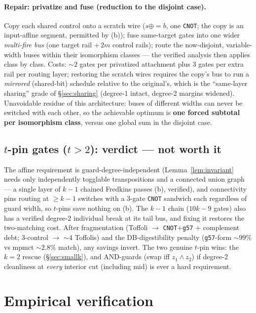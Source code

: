 \documentclass[11pt]{article}
\theoremstyle{remark}
\newcommand{\g}{\texttt{g57}}
\newcommand{\CNOT}{\texttt{CNOT}}
\begin{document}
\paragraph{Repair: privatize and fuse (reduction to the disjoint case).} Copy each shared
control onto a scratch wire ($s\mathrel{\oplus{=}}b$, one \CNOT; the copy is an input-affine
segment, permitted by (b)); fuse same-target gates into one wider \emph{multi-fire bus} (one
target rail $+\,2m$ control rails); route the now-disjoint, variable-width buses within their
isomorphism classes --- the verified analysis then applies class by class. Costs: ${\sim}2$
gates per privatized attachment plus $3$ gates per extra rail per routing layer; restoring the
scratch wires requires the copy's bus to run a \emph{mirrored} (shared-bit) schedule relative to
the original's, which is the ``same-layer sharing'' grade of \S\ref{sec:sharing} (degree-1
intact, degree-2 margins widened). Unavoidable residue of this architecture: buses of different
widths can never be switched with each other, so the achievable optimum is \textbf{one forced
subtotal per isomorphism class}, versus one global sum in the disjoint case.

\subsection{$t$-pin gates ($t>2$): verdict --- not worth it}\label{sec:tpin}

The affine requirement is guard-degree-independent (Lemma~\ref{lem:invariant} needs only
independently togglable transpositions and a connected union graph --- a single layer of $k{-}1$
chained Fredkins passes (b), verified), and connectivity pins routing at $\ge k-1$ switches with
a 3-gate \CNOT{} sandwich each regardless of guard width, so $t$-pins save nothing on (b). The
$k{-}1$ chain ($10k-9$ gates) also has a verified degree-2 individual break at its tail bus, and
fixing it restores the two-matching cost. After fragmentation (Toffoli $\to$ \CNOT+\g{}
+ complement debt; 3-control $\to$ ${\sim}4$ Toffolis) and the DB-digestibility penalty
(\g-form ${\sim}99\%$ vs mpmct ${\sim}2.8\%$ match), any savings invert. The two genuine
$t$-pin wins: the $k=2$ rescue (\S\ref{sec:smallk}), and AND-guards (swap iff $z_1\wedge z_2$)
if degree-2 cleanliness at \emph{every} interior cut (including mid) is ever a hard requirement.

\section{Empirical verification}\label{sec:verif}
\end{document}
